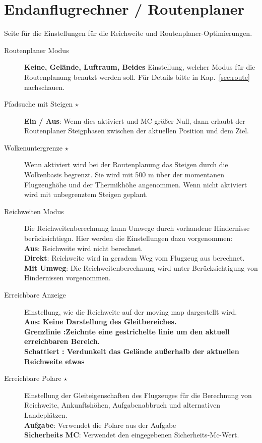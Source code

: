 \section{Endanflugrechner / Routenplaner}\label{sec:final-route}
Seite für die Einstellungen für die Reichweite und Routenplaner-Optimierungen.

\begin{description}
\item[Routenplaner Modus]  \label{conf:routemode} {\bf Keine, Gelände, Luftraum, Beides}
  Einstellung, welcher Modus für die Routenplanung benutzt werden soll. Für Details bitte in Kap.~\ref{sec:route} nachschauen.
\item[Pfadsuche mit Steigen $\star$]  {\bf Ein / Aus}: \label{conf:routeclimb} Wenn dies aktiviert und MC größer Null, dann erlaubt der Routenplaner
  Steigphasen zwischen der aktuellen Position und dem Ziel.
\item[Wolkenuntergrenze $\star$]  \label{conf:routeceiling} Wenn aktiviert wird bei der Routenplanung  das Steigen durch die Wolkenbasis begrenzt. Sie wird mit 500 m über der momentanen Flugzeughöhe und der Thermikhöhe angenommen.
  Wenn nicht aktiviert wird mit unbegrenztem Steigen geplant.
\item[Reichweiten Modus]  \label{conf:turningreach} Die Reichweitenberechnung kann Umwege durch vorhandene Hindernisse berücksichtiegn.
  Hier werden die Einstellungen dazu vorgenommen:\\
  {\bf Aus}: Reichweite wird nicht berechnet.\\
  {\bf Direkt}: Reichweite wird in geradem Weg vom Flugzeug aus berechnet.\\
  {\bf Mit Umweg}: Die Reichweitenberechnung wird unter Berücksichtigung von Hindernissen vorgenommen.
\item[Erreichbare Anzeige]  \label{conf:gliderange} Einstellung, wie die Reichweite auf der moving map dargestellt wird.\\
  \bf{Aus}: Keine Darstellung des Gleitbereiches.\\
  \bf{Grenzlinie }:Zeichnte eine gestrichelte linie um den aktuell erreichbaren Bereich.\\
  \bf{Schattiert }: Verdunkelt das Gelände außerhalb der aktuellen Reichweite etwas
\item[Erreichbare Polare $\star$]  \label{conf:reachpolar}
   Einstellung der Gleiteigenschaften des Flugzeuges für die Berechnung von Reichweite, Ankunftshöhen,
Aufgabenabbruch und alternativen Landeplätzen.\\
  {\bf Aufgabe}: Verwendet die Polare aus der Aufgabe\\
  {\bf Sicherheits MC}: Verwendet den eingegebenen Sicherheits-Mc-Wert.
\end{description}


